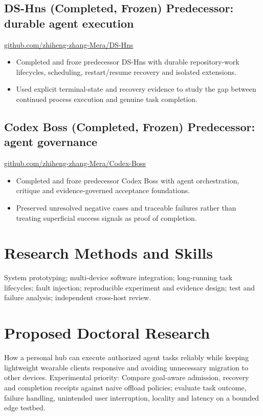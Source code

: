 \documentclass[10pt,a4paper]{article}
\begin{document}
\subsection*{DS-Hns (Completed, Frozen) \hfill \small Predecessor: durable agent execution}
\href{https://github.com/zhiheng-zhang-Mera/DS-Hns}{github.com/zhiheng-zhang-Mera/DS-Hns}
\begin{itemize}
\item Completed and froze predecessor DS-Hns with durable repository-work lifecycles, scheduling, restart/resume recovery and isolated extensions.
\item Used explicit terminal-state and recovery evidence to study the gap between continued process execution and genuine task completion.
\end{itemize}

\subsection*{Codex Boss (Completed, Frozen) \hfill \small Predecessor: agent governance}
\href{https://github.com/zhiheng-zhang-Mera/Codex-Boss}{github.com/zhiheng-zhang-Mera/Codex-Boss}
\begin{itemize}
\item Completed and froze predecessor Codex Boss with agent orchestration, critique and evidence-governed acceptance foundations.
\item Preserved unresolved negative cases and traceable failures rather than treating superficial success signals as proof of completion.
\end{itemize}

\section{Research Methods and Skills}
System prototyping; multi-device software integration; long-running task lifecycles; fault injection; reproducible experiment and evidence design; test and failure analysis; independent cross-host review.

\section{Proposed Doctoral Research}
How a personal hub can execute authorized agent tasks reliably while keeping lightweight wearable clients responsive and avoiding unnecessary migration to other devices. Experimental priority: Compare goal-aware admission, recovery and completion receipts against naive offload policies; evaluate task outcome, failure handling, unintended user interruption, locality and latency on a bounded edge testbed.

\par\smallskip{}
\end{document}

